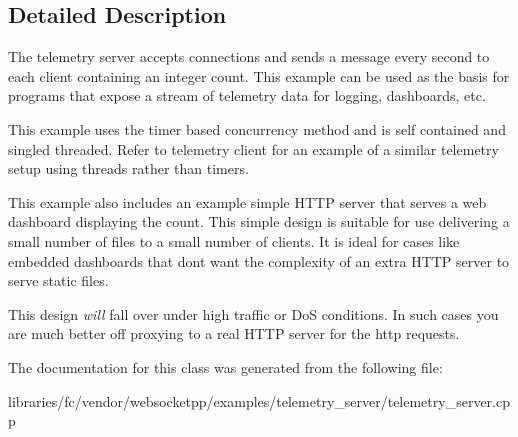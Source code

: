 \subsection{Detailed Description}
The telemetry server accepts connections and sends a message every second to each client containing an integer count. This example can be used as the basis for programs that expose a stream of telemetry data for logging, dashboards, etc.

This example uses the timer based concurrency method and is self contained and singled threaded. Refer to telemetry client for an example of a similar telemetry setup using threads rather than timers.

This example also includes an example simple H\+T\+TP server that serves a web dashboard displaying the count. This simple design is suitable for use delivering a small number of files to a small number of clients. It is ideal for cases like embedded dashboards that don\textquotesingle{}t want the complexity of an extra H\+T\+TP server to serve static files.

This design {\itshape will} fall over under high traffic or DoS conditions. In such cases you are much better off proxying to a real H\+T\+TP server for the http requests. 

The documentation for this class was generated from the following file\+:\begin{DoxyCompactItemize}
\item 
libraries/fc/vendor/websocketpp/examples/telemetry\+\_\+server/telemetry\+\_\+server.\+cpp\end{DoxyCompactItemize}
